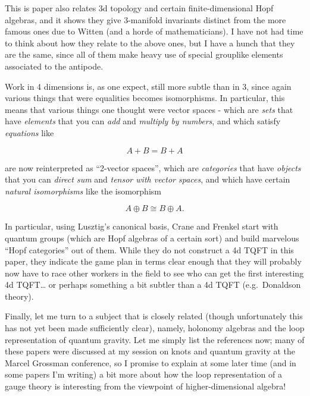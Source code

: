 \documentclass{article}
\def\tightlist{}
\renewcommand{\texttt}[1]{%
  \begingroup
  \ttfamily
  \begingroup\lccode`~=`/\lowercase{\endgroup\def~}{/\discretionary{}{}{}}%
  \begingroup\lccode`~=`[\lowercase{\endgroup\def~}{[\discretionary{}{}{}}%
  \begingroup\lccode`~=`.\lowercase{\endgroup\def~}{.\discretionary{}{}{}}%
  \catcode`/=\active\catcode`[=\active\catcode`.=\active
  \scantokens{#1\noexpand}%
  \endgroup
}
\begin{document}
This is paper also relates 3d topology and certain finite-dimensional
Hopf algebras, and it shows they give 3-manifold invariants distinct
from the more famous ones due to Witten (and a horde of mathematicians).
I have not had time to think about how they relate to the above ones,
but I have a hunch that they are the same, since all of them make heavy
use of special grouplike elements associated to the antipode.


Work in 4 dimensions is, as one expect, still more subtle than in 3,
since again various things that were equalities becomes isomorphisms. In
particular, this means that various things one thought were vector
spaces - which are \emph{sets} that have \emph{elements} that you can
\emph{add} and \emph{multiply by numbers}, and which satisfy
\emph{equations} like

\[A + B = B + A\]

are now reinterpreted as ``2-vector spaces'', which are
\emph{categories} that have \emph{objects} that you can \emph{direct
sum} and \emph{tensor with vector spaces}, and which have certain
\emph{natural isomorphisms} like the isomorphism

\[A \oplus B \cong B \oplus A.\]

In particular, using Lusztig's canonical basis, Crane and Frenkel start
with quantum groups (which are Hopf algebras of a certain sort) and
build marvelous ``Hopf categories'' out of them. While they do not
construct a 4d TQFT in this paper, they indicate the game plan in terms
clear enough that they will probably now have to race other workers in
the field to see who can get the first interesting 4d TQFT\ldots{} or
perhaps something a bit subtler than a 4d TQFT (e.g.~Donaldson theory).

Finally, let me turn to a subject that is closely related (though
unfortunately this has not yet been made sufficiently clear), namely,
holonomy algebras and the loop representation of quantum gravity. Let me
simply list the references now; many of these papers were discussed at
my session on knots and quantum gravity at the Marcel Grossman
conference, so I promise to explain at some later time (and in some
papers I'm writing) a bit more about how the loop representation of a
gauge theory is interesting from the viewpoint of higher-dimensional
algebra!
\end{document}
